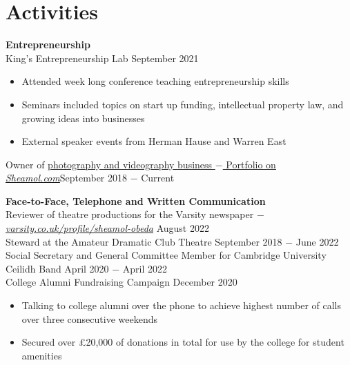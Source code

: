 \documentclass{article}
\begin{document}
\vspace{-.5\baselineskip}
\hrulefill
\vspace{-.5\baselineskip}

\clearpage
\section*{Activities}

\textbf{Entrepreneurship}\\
King's Entrepreneurship Lab \hfill September 2021
\begin{itemize}
    \item Attended week long conference teaching entrepreneurship skills
    \item Seminars included topics on start up funding, intellectual property law, and growing ideas into businesses
    \item External speaker events from Herman Hause and Warren East 
\end{itemize}
Owner of \href{www.sheamol.com}{photography and videography business $-$ Portfolio on \underline{\textit{Sheamol.com}}}\hfill September 2018 $-$ Current \medskip

\textbf{Face-to-Face, Telephone and Written Communication}\\
Reviewer of theatre productions for the Varsity newspaper $-$ \href{https://www.varsity.co.uk/profile/sheamol-obeda}{\underline{\textit{varsity.co.uk/profile/sheamol-obeda}}} \hfill August 2022 \\
Steward at the Amateur Dramatic Club Theatre \hfill September 2018 $-$ June 2022 \\
Social Secretary and General Committee Member for Cambridge University Ceilidh Band \hfill April 2020 $-$ April 2022\\
College Alumni Fundraising Campaign \hfill December 2020
\begin{itemize}
    \item Talking to college alumni over the phone to achieve highest number of calls over three consecutive weekends
    \item Secured over £20,000 of donations in total for use by the college for student amenities
\end{itemize} \medskip
\end{document}
